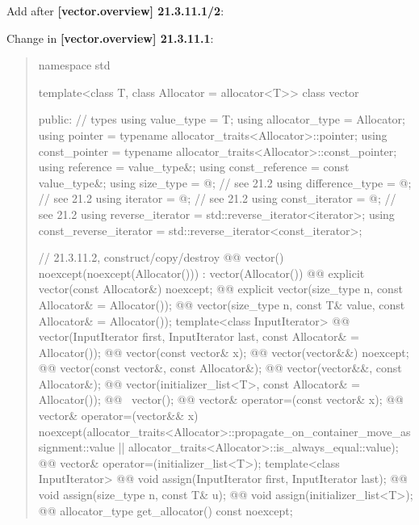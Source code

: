 \documentclass{wg21}
\begin{document}
Add after \textbf{[vector.overview] 21.3.11.1/2}:
\begin{quote}
\end{quote}

Change in \textbf{[vector.overview] 21.3.11.1}:
\begin{quote}
\begin{codeblock}
namespace std {
  template<class T, class Allocator = allocator<T>>
  class vector {
  public:
    // types
    using value_type             = T;
    using allocator_type         = Allocator;
    using pointer                = typename allocator_traits<Allocator>::pointer;
    using const_pointer          = typename allocator_traits<Allocator>::const_pointer;
    using reference              = value_type&;
    using const_reference        = const value_type&;
    using size_type              = @\impdef@; // see 21.2
    using difference_type        = @\impdef@; // see 21.2
    using iterator               = @\impdef@; // see 21.2
    using const_iterator         = @\impdef@; // see 21.2
    using reverse_iterator       = std::reverse_iterator<iterator>;
    using const_reverse_iterator = std::reverse_iterator<const_iterator>;

    // 21.3.11.2, construct/copy/destroy
    @@ vector() noexcept(noexcept(Allocator())) : vector(Allocator()) { }
    @@ explicit vector(const Allocator&) noexcept;
    @@ explicit vector(size_type n, const Allocator& = Allocator());
    @@ vector(size_type n, const T& value, const Allocator& = Allocator());
    template<class InputIterator>
      @@ vector(InputIterator first, InputIterator last, const Allocator& = Allocator());
    @@ vector(const vector& x);
    @@ vector(vector&&) noexcept;
    @@ vector(const vector&, const Allocator&);
    @@ vector(vector&&, const Allocator&);
    @@ vector(initializer_list<T>, const Allocator& = Allocator());
    @@ ~vector();
    @@ vector& operator=(const vector& x);
    @@ vector& operator=(vector&& x)
      noexcept(allocator_traits<Allocator>::propagate_on_container_move_assignment::value ||
               allocator_traits<Allocator>::is_always_equal::value);
    @@ vector& operator=(initializer_list<T>);
    template<class InputIterator>
      @@ void assign(InputIterator first, InputIterator last);
    @@ void assign(size_type n, const T& u);
    @@ void assign(initializer_list<T>);
    @@ allocator_type get_allocator() const noexcept;

}}
\end{codeblock}
\end{quote}
\end{document}
